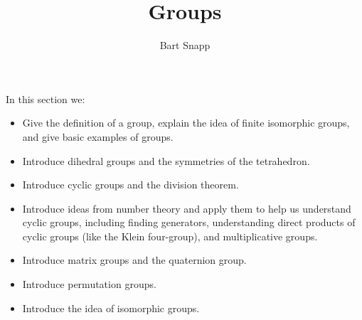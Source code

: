 \documentclass{ximera}
\author{Bart Snapp}
\title{Groups}
\begin{document}
\begin{abstract}
\end{abstract}
\maketitle
In this section we:

\begin{itemize}
\item Give the definition of a group, explain the idea of finite
  isomorphic groups, and give basic examples of groups.
\item Introduce dihedral groups and the symmetries of the tetrahedron.
\item Introduce cyclic groups and the division theorem.
\item Introduce ideas from number theory and apply them to help us
  understand cyclic groups, including finding generators,
  understanding direct products of cyclic groups (like the Klein
  four-group), and multiplicative groups.
\item Introduce matrix groups and the quaternion group.
\item Introduce permutation groups.
\item Introduce the idea of isomorphic groups.
\end{itemize}
\end{document}
